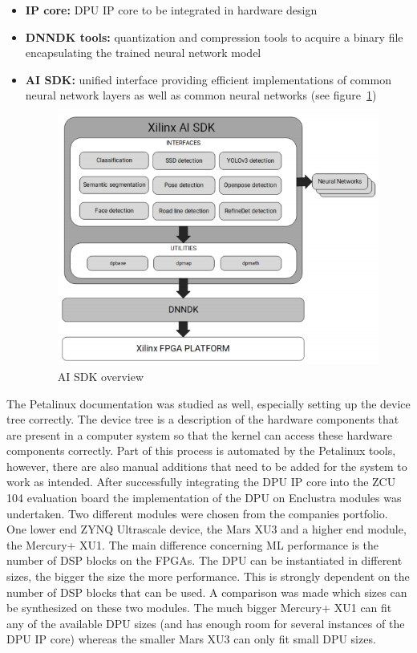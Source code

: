 \begin{itemize}
	\item \textbf{\ac{IP} core:} \ac{DPU} \ac{IP} core to be integrated in hardware design
	\item \textbf{\ac{DNNDK} tools:} quantization and compression tools to acquire a binary file encapsulating the trained neural network model
	\item \textbf{\ac{AI} \ac{SDK}:} unified interface providing efficient implementations of common neural network layers as well as common neural networks (see figure~\ref{fig:ai_sdk})
	\begin{figure}[!htb]
		\centering
			\includegraphics[width=\textwidth]{bilder/ai_sdk.png}
			\caption{\ac{AI} \ac{SDK} overview \cite{ai_sdk}}
			\label{fig:ai_sdk}
	\end{figure}
\end{itemize}
The Petalinux documentation was studied as well, especially setting up the device tree correctly. The device tree is a description of the hardware components that are present in a computer system so that the kernel can access these hardware components correctly. Part of this process is automated by the Petalinux tools, however, there are also manual additions that need to be added for the system to work as intended.
After successfully integrating the \ac{DPU} \ac{IP} core into the ZCU 104 evaluation board the implementation of the \ac{DPU} on Enclustra modules was undertaken. Two different modules were chosen from the companies portfolio. One lower end ZYNQ Ultrascale device, the Mars XU3 and a higher end module, the Mercury+ XU1. The main difference concerning \ac{ML} performance is the number of \ac{DSP} blocks on the \acp{FPGA}. The \ac{DPU} can be instantiated in different sizes, the bigger the size the more performance. This is strongly dependent on the number of \ac{DSP} blocks that can be used. A comparison was made which sizes can be synthesized on these two modules. The much bigger Mercury+ XU1 can fit any of the available \ac{DPU} sizes (and has enough room for several instances of the \ac{DPU} \ac{IP} core) whereas the smaller Mars XU3 can only fit small \ac{DPU} sizes.
